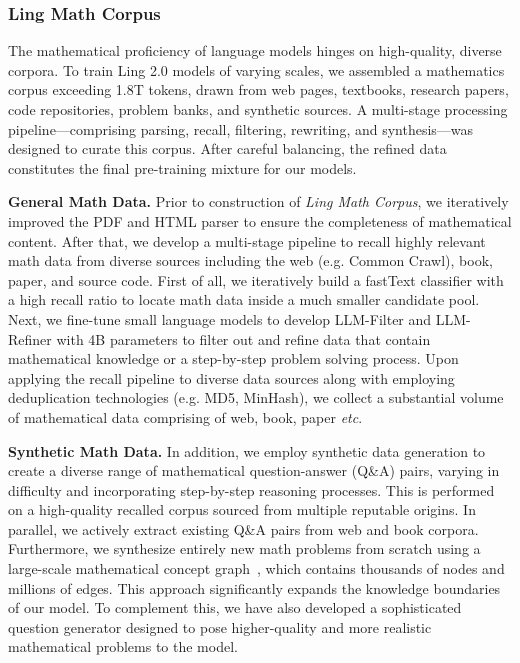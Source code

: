 \documentclass[table]{gtech}
\theoremstyle{definition}
\begin{document}
\subsubsection{Ling Math Corpus}\label{appendix:math}
The mathematical proficiency of language models hinges on high-quality, diverse corpora. To train Ling 2.0 models of varying scales, we assembled a mathematics corpus exceeding 1.8T tokens, drawn from web pages, textbooks, research papers, code repositories, problem banks, and synthetic sources. A multi-stage processing pipeline—comprising parsing, recall, filtering, rewriting, and synthesis—was designed to curate this corpus. After careful balancing, the refined data constitutes the final pre-training mixture for our models.

{\bfseries General Math Data. }
Prior to construction of \emph{Ling Math Corpus}, we iteratively improved the PDF and HTML parser to ensure the completeness of mathematical content. After that, we develop a multi-stage pipeline to recall highly relevant math data from diverse sources including the web (e.g. Common Crawl), book, paper, and source code. First of all, we iteratively build a fastText classifier with a high recall ratio to locate math data inside a much smaller candidate pool. Next, we fine-tune small language models to develop LLM-Filter and LLM-Refiner with 4B parameters to filter out and refine data that contain mathematical knowledge or a step-by-step problem solving process. Upon applying the recall pipeline to diverse data sources along with employing deduplication technologies (e.g. MD5, MinHash), we collect a substantial volume of mathematical data comprising of web, book, paper \emph{etc}.

{\bfseries Synthetic Math Data. }
In addition, we employ synthetic data generation to create a diverse range of mathematical question-answer (Q\&A) pairs, varying in difficulty and incorporating step-by-step reasoning processes. This is performed on a high-quality recalled corpus sourced from multiple reputable origins. In parallel, we actively extract existing Q\&A pairs from web and book corpora. Furthermore, we synthesize entirely new math problems from scratch using a large-scale mathematical concept graph~\citep{chen2025arrows}, which contains thousands of nodes and millions of edges. This approach significantly expands the knowledge boundaries of our model. To complement this, we have also developed a sophisticated question generator designed to pose higher-quality and more realistic mathematical problems to the model.
\end{document}
